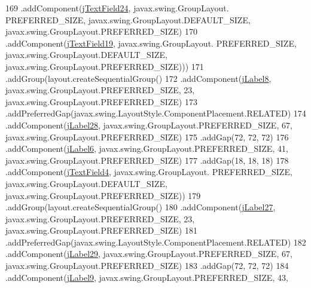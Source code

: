 \begin{DoxyCode}
169                                     .addComponent(\mbox{\hyperlink{classinterfacessoguar_1_1paenrique_a7c88cab75dfa57f0ba92d8c84f8851d2}{jTextField24}}, javax.swing.GroupLayout.
      PREFERRED\_SIZE, javax.swing.GroupLayout.DEFAULT\_SIZE, javax.swing.GroupLayout.PREFERRED\_SIZE)
170                                     .addComponent(\mbox{\hyperlink{classinterfacessoguar_1_1paenrique_af87913542063bf9f8df4c2adeb0da744}{jTextField19}}, javax.swing.GroupLayout.
      PREFERRED\_SIZE, javax.swing.GroupLayout.DEFAULT\_SIZE, javax.swing.GroupLayout.PREFERRED\_SIZE)))
171                             .addGroup(layout.createSequentialGroup()
172                                 .addComponent(\mbox{\hyperlink{classinterfacessoguar_1_1paenrique_ac20f17274561ba46a613d1f05c5bb218}{jLabel8}}, javax.swing.GroupLayout.PREFERRED\_SIZE, 23, 
      javax.swing.GroupLayout.PREFERRED\_SIZE)
173                                 .addPreferredGap(javax.swing.LayoutStyle.ComponentPlacement.RELATED)
174                                 .addComponent(\mbox{\hyperlink{classinterfacessoguar_1_1paenrique_ac87555268164c8333fa21ca04c5cb402}{jLabel28}}, javax.swing.GroupLayout.PREFERRED\_SIZE, 67,
       javax.swing.GroupLayout.PREFERRED\_SIZE)
175                                 .addGap(72, 72, 72)
176                                 .addComponent(\mbox{\hyperlink{classinterfacessoguar_1_1paenrique_aefb6dc4d3f0f469be0d03f9f4c7326bb}{jLabel6}}, javax.swing.GroupLayout.PREFERRED\_SIZE, 41, 
      javax.swing.GroupLayout.PREFERRED\_SIZE)
177                                 .addGap(18, 18, 18)
178                                 .addComponent(\mbox{\hyperlink{classinterfacessoguar_1_1paenrique_a2302a6403a015e775096556c687e4fe1}{jTextField4}}, javax.swing.GroupLayout.
      PREFERRED\_SIZE, javax.swing.GroupLayout.DEFAULT\_SIZE, javax.swing.GroupLayout.PREFERRED\_SIZE))
179                             .addGroup(layout.createSequentialGroup()
180                                 .addComponent(\mbox{\hyperlink{classinterfacessoguar_1_1paenrique_a2f3f435766dfa8d25ce72db778454f41}{jLabel27}}, javax.swing.GroupLayout.PREFERRED\_SIZE, 23,
       javax.swing.GroupLayout.PREFERRED\_SIZE)
181                                 .addPreferredGap(javax.swing.LayoutStyle.ComponentPlacement.RELATED)
182                                 .addComponent(\mbox{\hyperlink{classinterfacessoguar_1_1paenrique_acb0b1be4c242fe2664aef099461f11b3}{jLabel29}}, javax.swing.GroupLayout.PREFERRED\_SIZE, 67,
       javax.swing.GroupLayout.PREFERRED\_SIZE)
183                                 .addGap(72, 72, 72)
184                                 .addComponent(\mbox{\hyperlink{classinterfacessoguar_1_1paenrique_aeb67da672ddf8c985dec99dc697b750c}{jLabel9}}, javax.swing.GroupLayout.PREFERRED\_SIZE, 43, 

\end{DoxyCode}
